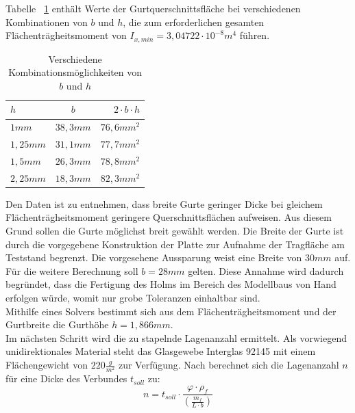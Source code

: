 \noindent Tabelle ~\ref{bh} enthält Werte der Gurtquerschnittsfläche bei verschiedenen Kombinationen von $ b $ und $ h $, die zum erforderlichen gesamten Flächenträgheitsmoment von $ I_{x,min} = 3,04722 \cdot 10^{-8} m^{4} $ führen.\\
\begin{table}[h]
	\caption{Verschiedene Kombinationsmöglichkeiten von $ b $ und $ h $}
	\label{bh}
	\begin{center}
		\begin{tabular}{l|c|r}
			$h$&$b$&$2\cdot b\cdot h$\\
			\hline
			$1mm$&$38,3mm$&$76,6mm^{2}$\\
			$1,25mm$&$31,1mm$&$77,7mm^{2}$\\
			$1,5mm$&$26,3mm$&$78,8mm^{2}$\\
			$2,25mm$&$18,3mm$&$82,3mm^{2}$\\
		\end{tabular}
	\end{center}
\end{table}

\noindent Den Daten ist zu entnehmen, dass breite Gurte geringer Dicke bei gleichem Flächenträgheitsmoment geringere Querschnittsflächen aufweisen. Aus diesem Grund sollen die Gurte möglichst breit gewählt werden. Die Breite der Gurte ist durch die vorgegebene Konstruktion der Platte zur Aufnahme der Tragfläche am Teststand begrenzt. Die vorgesehene Aussparung weist eine Breite von $ 30mm $ auf. Für die weitere Berechnung soll $ b=28mm $ gelten. Diese Annahme wird dadurch begründet, dass die Fertigung des Holms im Bereich des Modellbaus von Hand erfolgen würde, womit nur grobe Toleranzen einhaltbar sind.\\

\noindent Mithilfe eines Solvers bestimmt sich aus dem Flächenträgheitsmoment und der Gurtbreite die Gurthöhe $ h=1,866mm $.\\
\noindent Im nächsten Schritt wird die zu stapelnde Lagenanzahl ermittelt. Als vorwiegend unidirektionales Material steht das Glasgewebe Interglas 92145 mit einem Flächengewicht von $ 220\frac{g}{m^{2}} $ zur Verfügung. Nach \cite{item3} berechnet sich die Lagenanzahl $ n $ für eine Dicke des Verbundes $ t_{soll} $ zu:\\

\begin{equation}
	\label{gurtlagen}
	n=t_{soll}\cdot \frac{\varphi\cdot\rho_{f}}{\left(\frac{m_{f}}{L\cdot b}\right)}
\end{equation}

